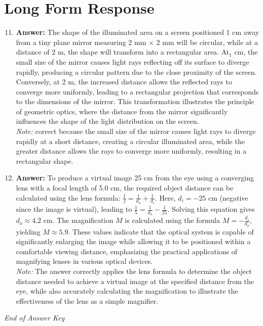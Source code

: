 \documentclass[12pt]{article}
\begin{document}
\section*{Long Form Response}
\begin{enumerate}[label=\arabic*.]
\setcounter{enumi}{10}
\item \textbf{Answer:} The shape of the illuminated area on a screen positioned 1 cm away from a tiny plane mirror measuring 2 mm \ensuremath{\times} 2 mm will be circular, while at a distance of 2 m, the shape will transform into a rectangular area. At$_{1}$ cm, the small size of the mirror causes light rays reflecting off its surface to diverge rapidly, producing a circular pattern due to the close proximity of the screen. Conversely, at 2 m, the increased distance allows the reflected rays to converge more uniformly, leading to a rectangular projection that corresponds to the dimensions of the mirror. This transformation illustrates the principle of geometric optics, where the distance from the mirror significantly influences the shape of the light distribution on the screen.
\\ \textit{Note:} correct because the small size of the mirror causes light rays to diverge rapidly at a short distance, creating a circular illuminated area, while the greater distance allows the rays to converge more uniformly, resulting in a rectangular shape.
\item \textbf{Answer:} To produce a virtual image 25 cm from the eye using a converging lens with a focal length of 5.0 cm, the required object distance can be calculated using the lens formula: \( \frac{1}{f} = \frac{1}{d_o} + \frac{1}{d_i} \). Here, \( d_i = -25 \) cm (negative since the image is virtual), leading to \( \frac{1}{5} = \frac{1}{d_o} - \frac{1}{25} \). Solving this equation gives \( d_o \approx 4.2 \) cm. The magnification \( M \) is calculated using the formula \( M = -\frac{d_i}{d_o} \), yielding \( M \approx 5.9 \). These values indicate that the optical system is capable of significantly enlarging the image while allowing it to be positioned within a comfortable viewing distance, emphasizing the practical applications of magnifying lenses in various optical devices.
\\ \textit{Note:} The answer correctly applies the lens formula to determine the object distance needed to achieve a virtual image at the specified distance from the eye, while also accurately calculating the magnification to illustrate the effectiveness of the lens as a simple magnifier.
\end{enumerate}

\vfill
\noindent\textit{End of Answer Key}
\end{document}
